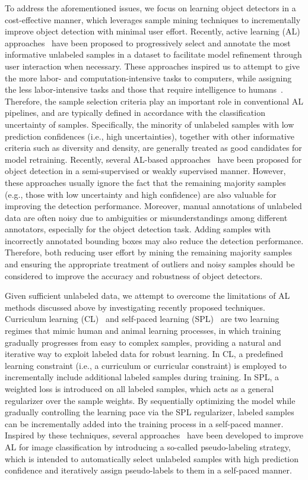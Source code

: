 \documentclass[journal]{IEEEtran}
\begin{document}
To address the aforementioned issues, we focus on {learning object detectors in a cost-effective manner, which leverages} sample mining techniques to incrementally improve object detection with minimal user effort. {Recently,} active learning (AL) approaches~\cite{lewis1994sequential} have been proposed to progressively select and annotate the most informative unlabeled samples in a dataset to facilitate model refinement through user interaction when necessary. These approaches inspired us to attempt to give the more labor- and computation-intensive tasks to computers, while assigning the less labor-intensive tasks and those that require intelligence to humans~\cite{ISed}. {Therefore, the sample selection criteria play an important role in conventional AL pipelines, and are typically defined in accordance with the classification uncertainty of samples.} Specifically, the minority of unlabeled samples with low prediction confidences (i.e., high uncertainties), together with other informative criteria such as diversity and density, are generally treated as good candidates for {model retraining}. Recently, several AL-based approaches~\cite{llal11CVPR,id17CSR} have been proposed for object detection in a semi-supervised or weakly supervised manner. However, these approaches usually ignore the fact that the remaining majority samples (e.g., those with low uncertainty and high confidence) are also valuable for improving the detection performance. Moreover, manual annotations of unlabeled data are often noisy due to ambiguities or misunderstandings among different annotators, especially for the object detection task. Adding samples with incorrectly annotated bounding boxes may also reduce the detection performance. Therefore, both reducing user effort by mining the remaining majority samples and ensuring the appropriate treatment of outliers and noisy samples should be considered to improve the accuracy and robustness of object detectors.


Given sufficient unlabeled data, we attempt to overcome the {limitations of AL methods discussed} above by investigating recently proposed techniques. Curriculum learning (CL)~\cite{curriculun_learning} and self-paced learning (SPL)~\cite{letf11CVPR, spcl} are two learning regimes that mimic human and animal learning processes, in which training gradually progresses from easy to complex samples, providing a natural and iterative way to exploit labeled data for robust learning. In {CL}, a predefined learning constraint (i.e., a curriculum or curricular constraint) is {employed} to {incrementally} include additional labeled samples during training. In SPL, a weighted loss is introduced on all labeled samples, which acts as a general regularizer over the sample weights. By sequentially optimizing the model while gradually controlling the learning pace via the SPL regularizer, labeled samples can be incrementally added into the training process in a self-paced manner. Inspired by these techniques, several approaches~\cite{ceal16tcsvt, aspl15TPAMI} have been developed to improve AL for image classification by introducing a so-called pseudo-labeling strategy, which is intended to automatically select unlabeled samples with high prediction confidence and iteratively assign pseudo-labels to them in a self-paced manner. 
\end{document}
